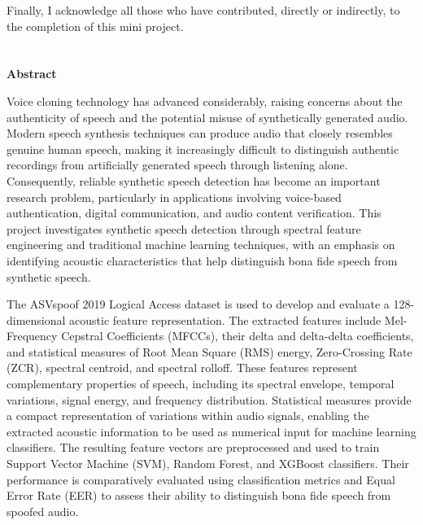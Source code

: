 \documentclass[12pt,a4paper]{report}
\begin{document}
\noindent
Finally, I acknowledge all those who have contributed, directly
or indirectly, to the completion of this mini project.


\clearpage

\clearpage
\chapter*{}
\thispagestyle{prelimpages}
\vspace*{-1.0cm}
\begin{center}
    {\fontsize{16pt}{20pt}\selectfont\bfseries Abstract}
\end{center}

\vspace{0.6cm}

\noindent
Voice cloning technology has advanced considerably, raising concerns about the authenticity of speech and the potential misuse of synthetically generated audio. Modern speech synthesis techniques can produce audio that closely resembles genuine human speech, making it increasingly difficult to distinguish authentic recordings from artificially generated speech through listening alone. Consequently, reliable synthetic speech detection has become an important research problem, particularly in applications involving voice-based authentication, digital communication, and audio content verification. This project investigates synthetic speech detection through spectral feature engineering and traditional machine learning techniques, with an emphasis on identifying acoustic characteristics that help distinguish bona fide speech from synthetic speech.

\vspace{0.3cm}

\noindent
The ASVspoof 2019 Logical Access dataset is used to develop and evaluate a 128-dimensional acoustic feature representation. The extracted features include Mel-Frequency Cepstral Coefficients (MFCCs), their delta and delta-delta coefficients, and statistical measures of Root Mean Square (RMS) energy, Zero-Crossing Rate (ZCR), spectral centroid, and spectral rolloff. These features represent complementary properties of speech, including its spectral envelope, temporal variations, signal energy, and frequency distribution. Statistical measures provide a compact representation of variations within audio signals, enabling the extracted acoustic information to be used as numerical input for machine learning classifiers. The resulting feature vectors are preprocessed and used to train Support Vector Machine (SVM), Random Forest, and XGBoost classifiers. Their performance is comparatively evaluated using classification metrics and Equal Error Rate (EER) to assess their ability to distinguish bona fide speech from spoofed audio.
\end{document}
